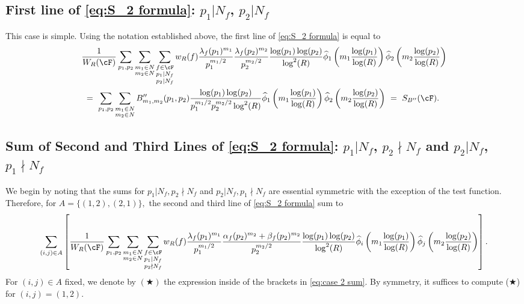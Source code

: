 \documentclass[11pt, reqno]{amsart}
\theoremstyle{definition}
\theoremstyle{remark}
\numberwithin{equation}{section}
\renewcommand{\hat}{\widehat}
\begin{document}
\subsection{\texorpdfstring{First line of \eqref{eq:S_2 formula}: $p_1 | N_f$, $p_2 | N_f$}{Computation of the first line of S2}} This case is simple. Using the notation established above, the first line of \eqref{eq:S_2 formula} is equal to
\begin{align}
   &\frac{1}{W_R(\cF)}\sum_{p_1,p_2}\sum_{\substack{m_1\in N\\m_2\in N}}\sum_{\substack{f\in \cF\\p_1|N_f\\p_2|N_f }}w_R(f)\frac{\lambda_f(p_1)^{m_1}}{p_1^{m_1/2}}  \frac{\lambda_f(p_2)^{m_2}}{p_2^{m_2/2}} \frac{\log(p_1)\log (p_2)}{\log^2(R)}\hat\phi_1 \left(m_1 \frac{\log(p_1)}{\log(R)}\right)\hat \phi_2 \left(m_2 \frac{\log(p_2)}{\log(R)}\right)  \notag \\
    &\ = \  \sum_{p_1,p_2}\sum_{\substack{m_1\in N\\m_2\in N}}  B''_{m_1,m_2}(p_1,p_2) \frac{\log(p_1)\log(p_2)}{p_1^{m_1/2}p_2^{m_2/2}\log^2(R)}\hat\phi_1 \left(m_1 \frac{\log(p_1)}{\log(R)}\right)\hat \phi_2 \left(m_2 \frac{\log(p_2)}{\log(R)}\right) \ = \  S_{B''}(\cF).
\end{align}

\subsection{\texorpdfstring{Sum of Second and Third Lines of \eqref{eq:S_2 formula}:  $p_1 | N_f$, $p_2 \nmid N_f$ and $p_2 | N_f$, $p_1 \nmid N_f$}{Sum of second and third lines of S2}}
We begin by noting that the sums for $p_1 | N_f, p_2 \nmid N_f$ and $p_2 | N_f, p_1 \nmid N_f$ are essential symmetric with the exception of the test function.  Therefore,  for $A=\{(1,2), (2,1)\},$ the second and third line of \eqref{eq:S_2 formula} sum to
 \footnotesize{\begin{align} \label{eq:case 2 sum} 
   \sum_{(i,j) \in A} \left[\frac{1}{W_R(\cF)}\sum_{p_1,p_2}\sum_{\substack{m_1\in N\\m_2\in N}}\sum_{\substack{f\in \cF\\p_1|N_f\\p_2\nmid N_f }}w_R(f)\frac{\lambda_f(p_1)^{m_1}}{p_1^{m_1/2}}\frac{\alpha_f(p_2)^{m_2}+\beta_f(p_2)^{m_2}}{p_2^{m_2/2}} \frac{\log(p_1)\log (p_2)}{\log^2(R)}\hat\phi_i \left(m_1 \frac{\log(p_1)}{\log(R)}\right)\hat \phi_j \left(m_2 \frac{\log(p_2)}{\log(R)}\right)\right].
\end{align}}
\normalsize
For $(i,j)\in A$ fixed, we denote by $(\bigstar)$ the expression inside of the brackets in \eqref{eq:case 2 sum}. By symmetry, it suffices to compute ($\bigstar$) for $(i,j) = (1,2)$.
\end{document}
